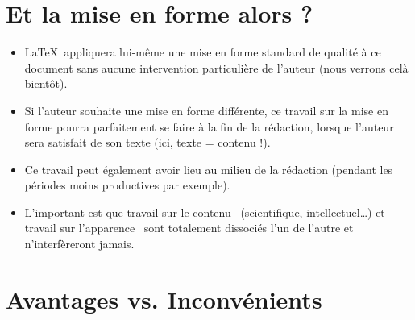 \section{Et la mise en forme alors ?}

\begin{itemize}
\item \LaTeX\ appliquera lui-même une mise en forme standard de
  qualité à ce document sans aucune intervention particulière de
  l'auteur (nous verrons celà bientôt).
\item Si l'auteur souhaite une mise en forme différente, ce travail
  sur la mise en forme pourra parfaitement se faire à la fin de la
  rédaction, lorsque l'auteur sera satisfait de son texte (ici, texte
  = contenu !).
\item Ce travail peut également avoir lieu au milieu de la rédaction
  (pendant les périodes moins productives par exemple).
\item L'important est que \og travail sur le contenu \fg\
  (scientifique, intellectuel\ldots) et \og travail sur l'apparence
  \fg\ sont totalement dissociés l'un de l'autre et n'interfèreront
  jamais.
\end{itemize}



\section{Avantages vs. Inconvénients}



